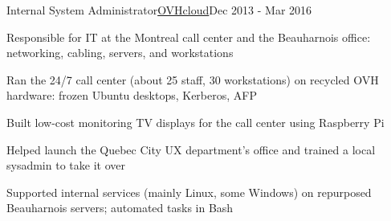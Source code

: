 \begin{joblong}{Internal System Administrator}{\href{https://www.ovhcloud.com}{OVHcloud}}{Dec 2013 - Mar 2016}
\item Responsible for IT at the Montreal call center and the Beauharnois office: networking, cabling, servers, and workstations
\item Ran the 24/7 call center (about 25 staff, 30 workstations) on recycled OVH hardware: frozen Ubuntu desktops, Kerberos, AFP
\item Built low-cost monitoring TV displays for the call center using Raspberry Pi
\item Helped launch the Quebec City UX department's office and trained a local sysadmin to take it over
\item Supported internal services (mainly Linux, some Windows) on repurposed Beauharnois servers; automated tasks in Bash
\end{joblong}
